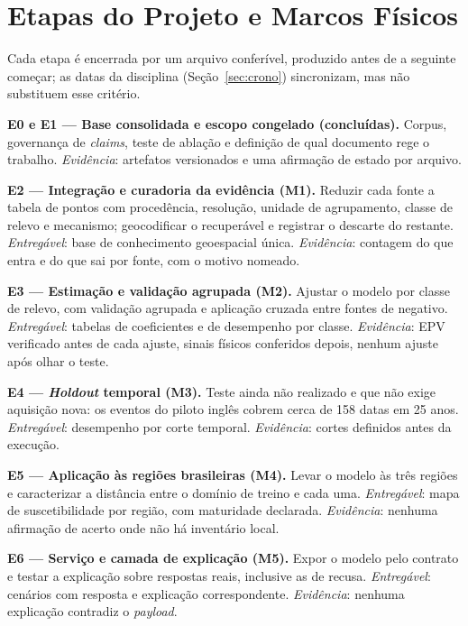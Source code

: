 \documentclass[conference]{IEEEtran}
\begin{document}
\section{Etapas do Projeto e Marcos Físicos}
\label{sec:etapas}

Cada etapa é encerrada por um arquivo conferível, produzido antes de a seguinte
começar; as datas da disciplina (Seção~\ref{sec:crono}) sincronizam, mas não
substituem esse critério.

\textbf{E0 e E1 --- Base consolidada e escopo congelado (concluídas).} Corpus,
governança de \emph{claims}, teste de ablação e definição de qual documento rege
o trabalho. \emph{Evidência}: artefatos versionados e uma afirmação de estado por
arquivo.

\textbf{E2 --- Integração e curadoria da evidência (M1).} Reduzir cada fonte a tabela de
pontos com procedência, resolução, unidade de agrupamento, classe de relevo e
mecanismo; geocodificar o recuperável e registrar o descarte do restante.
\emph{Entregável}: base de conhecimento geoespacial única. \emph{Evidência}: contagem
do que entra e do que sai por fonte, com o motivo nomeado.

\textbf{E3 --- Estimação e validação agrupada (M2).} Ajustar o modelo por classe
de relevo, com validação agrupada e aplicação cruzada entre fontes de negativo.
\emph{Entregável}: tabelas de coeficientes e de desempenho por classe.
\emph{Evidência}: EPV verificado antes de cada ajuste, sinais físicos conferidos
depois, nenhum ajuste após olhar o teste.

\textbf{E4 --- \emph{Holdout} temporal (M3).} Teste ainda não realizado e que não
exige aquisição nova: os eventos do piloto inglês cobrem cerca de 158 datas em 25
anos. \emph{Entregável}: desempenho por corte temporal. \emph{Evidência}: cortes
definidos antes da execução.

\textbf{E5 --- Aplicação às regiões brasileiras (M4).} Levar o modelo às três
regiões e caracterizar a distância entre o domínio de treino e cada uma.
\emph{Entregável}: mapa de suscetibilidade por região, com maturidade declarada.
\emph{Evidência}: nenhuma afirmação de acerto onde não há inventário local.

\textbf{E6 --- Serviço e camada de explicação (M5).} Expor o modelo pelo contrato
e testar a explicação sobre respostas reais, inclusive as de recusa.
\emph{Entregável}: cenários com resposta e explicação correspondente.
\emph{Evidência}: nenhuma explicação contradiz o \emph{payload}.
\end{document}
